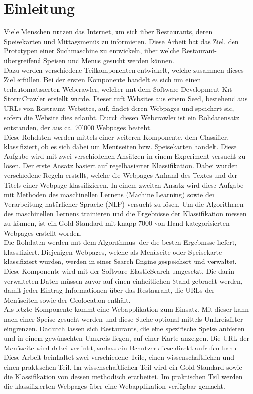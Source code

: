 \chapter{Einleitung}
Viele Menschen nutzen das Internet, um sich über Restaurants, deren Speisekarten und Mittagsmenüs zu informieren.
Diese Arbeit hat das Ziel, den Prototypen einer Suchmaschine zu entwickeln, über welche Restaurant-übergreifend Speisen und Menüs gesucht werden können.\\
Dazu werden verschiedene Teilkomponenten entwickelt, welche zusammen dieses Ziel erfüllen.
Bei der ersten Komponente handelt es sich um einen teilautomatisierten Webcrawler, welcher mit dem Software Development Kit \glqq StormCrawler\grqq{} erstellt wurde.
Dieser ruft Websites aus einem Seed, bestehend aus URLs von Restraunt-Websites, auf, findet deren Webpages  und speichert sie, sofern die Website dies erlaubt.
Durch diesen Webcrawler ist ein Rohdatensatz entstanden, der aus ca. 70'000 Webpages besteht.\\
Diese Rohdaten werden mittels einer weiteren Komponente, dem Classifier, klassifiziert, ob es sich dabei um Menüseiten bzw. Speisekarten handelt.
Diese Aufgabe wird mit zwei verschiedenen Ansätzen in einem Experiment versucht zu lösen.
Der erste Ansatz basiert auf regelbasierter Klassifikation.
Dabei wurden verschiedene Regeln erstellt, welche die Webpages Anhand des Textes und der Titels einer Webpage klassifizieren.
In einem zweiten Ansatz wird diese Aufgabe mit Methoden des maschinellen Lernens (Machine Learning) sowie der Verarbeitung natürlicher Sprache (NLP) versucht zu lösen.
Um die Algorithmen des maschinellen Lernens trainieren und die Ergebnisse der Klassifikation messen zu können, ist ein Gold Standard mit knapp 7000 von Hand kategorisierten Webpages erstellt worden.\\
Die Rohdaten werden mit dem Algorithmus, der die besten Ergebnisse liefert, klassifiziert.
Diejenigen Webpages, welche als Menüseite oder Speisekarte klassifiziert wurden, werden in einer Search Engine gespeichert und verwaltet.
Diese Komponente wird mit der Software ElasticSearch umgesetzt.
Die darin verwalteten Daten müssen zuvor auf einen einheitlichen Stand gebracht werden, damit jeder Eintrag Informationen über das Restaurant, die URLs der Menüseiten sowie der Geolocation enthält.\\
Als letzte Komponente kommt eine Webapplikation zum Einsatz. 
Mit dieser kann nach einer Speise gesucht werden und diese Suche optional mittels Umkreisfilter eingrenzen.
Dadurch lassen sich Restaurants, die eine spezifische Speise anbieten und in einem gewünschten Umkreis liegen, auf einer Karte anzeigen.
Die URL der Menüseite wird dabei verlinkt, sodass ein Benutzer diese direkt aufrufen kann.\\
Diese Arbeit beinhaltet zwei verschiedene Teile, einen wissenschaftlichen und einen praktischen Teil.
Im wissenschaftlichen Teil wird ein Gold Standard sowie die Klassifikation von dessen methodisch erarbeitet.
Im praktischen Teil werden die klassifizierten Webpages über eine Webapplikation verfügbar gemacht.